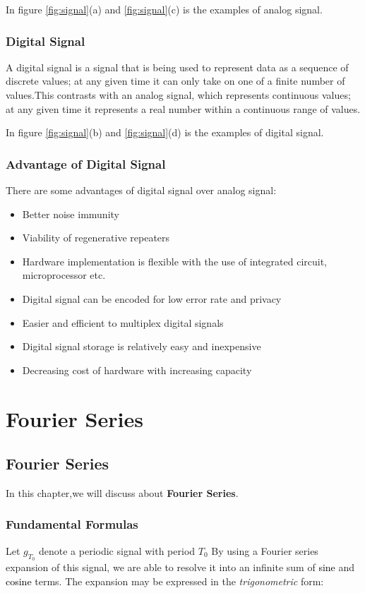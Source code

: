 \documentclass{report}
\begin{document}
In figure \ref{fig:signal}(a) and \ref{fig:signal}(c) is the examples of analog signal.
\subsection{Digital Signal}
A digital signal is a signal that is being used to represent data as a sequence of discrete values; at any given time it can only take on one of a finite number of values.This contrasts with an analog signal, which represents continuous values; at any given time it represents a real number within a continuous range of values.

In figure \ref{fig:signal}(b) and \ref{fig:signal}(d) is the examples of digital signal.

\subsection{Advantage of Digital Signal}
There are some advantages of digital signal over analog signal:
\begin{itemize}
\item Better noise immunity
\item Viability of regenerative repeaters
\item Hardware implementation is flexible with the use of integrated circuit, microprocessor etc.
\item Digital signal can be encoded for low error rate  and privacy 
\item Easier and efficient to multiplex digital signals
\item Digital signal storage is relatively easy and inexpensive
\item Decreasing cost of hardware with increasing capacity

\end{itemize}

\chapter{Fourier Series}
\section{Fourier Series}
In this chapter,we will discuss about \textbf{Fourier Series}.
\subsection{Fundamental Formulas}

Let $g_{T_0}$ denote a periodic signal with period $ T_{0} $ By using a Fourier series expansion of this signal, we are able to resolve it into an infinite sum of \textcolor{black}{sine} and \textcolor{black}{cosine} terms.
The expansion may be expressed in the \textit{trigonometric} form:
\end{document}
